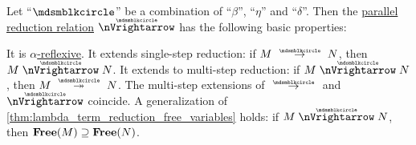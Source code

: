 \begin{proposition}\label{thm:def:parallel_reduction}
  Let \enquote{\( {\Anon} \)} be a combination of \enquote{\( \beta \)}, \enquote{\( \eta \)} and \enquote{\( \delta \)}. Then the \hyperref[def:parallel_reduction]{parallel reduction relation} \( {\ppred} \) has the following basic properties:
  \begin{thmenum}
     It is \hyperref[def:alpha_reflexive]{\( \alpha \)-reflexive}.
     It extends single-step reduction: if \( M \pred N \), then \( M \ppred N \).
     It extends to multi-step reduction: if \( M \ppred N \), then \( M \pred* N \).
     The multi-step extensions of \( {\pred} \) and \( {\ppred} \) coincide.
     A generalization of \cref{thm:lambda_term_reduction_free_variables} holds: if \( M \ppred N \), then \( \op*{Free}(M) \supseteq \op*{Free}(N) \).
  \end{thmenum}
\end{proposition}
